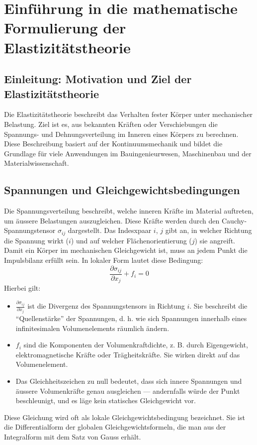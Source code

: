 %
%
%
%
\section{Einführung in die mathematische Formulierung der Elastizitätstheorie
\label{elastomechanik:section:math}}

\subsection{Einleitung: Motivation und Ziel der Elastizitätstheorie}
Die Elastizitätstheorie beschreibt das Verhalten fester Körper unter
mechanischer Belastung.
Ziel ist es, aus bekannten Kräften oder Verschiebungen die Spannungs-
und Dehnungsverteilung im Inneren eines Körpers zu berechnen.
Diese Beschreibung basiert auf der Kontinuumsmechanik und bildet
%
die Grundlage für viele Anwendungen im Bauingenieurwesen, Maschinenbau
und der Materialwissenschaft.

\subsection{Spannungen und Gleichgewichtsbedingungen
\label{elastomechanik:math:subsection:gleichgewicht}}
Die Spannungsverteilung beschreibt, welche inneren Kräfte im Material
auftreten, um äussere Belastungen auszugleichen.
Diese Kräfte werden durch den Cauchy-Spannungstensor $\sigma_{ij}$
dargestellt.
%
Das Indesxpaar $i$, $j$ gibt an, in welcher Richtung die Spannung
wirkt ($i$) und auf welcher Flächenorientierung ($j$) sie angreift.
Damit ein Körper im mechanischen Gleichgewicht ist, muss an jedem
Punkt die Impulsbilanz erfüllt sein. In lokaler Form lautet diese
Bedingung:
\begin{equation}
	\frac{\partial \sigma_{ij}}{\partial x_j} + f_i = 
	0
\label{elastomechanik:math:eqn:gleichgewicht}
\end{equation}
Hierbei gilt:
\begin{itemize}
\item $\frac{\partial \sigma_{ij}}{\partial x_j}$ ist die
Divergenz des Spannungstensors in Richtung $i$.  Sie beschreibt die
``Quellenstärke'' der Spannungen, d. h.  wie sich Spannungen innerhalb
eines infinitesimalen Volumenelements räumlich ändern.
\item $f_i$ sind die Komponenten der Volumenkraftdichte, z. B. durch
Eigengewicht, elektromagnetische Kräfte oder Trägheitskräfte. Sie
wirken direkt auf das Volumenelement.
\item Das Gleichheitszeichen zu null bedeutet, dass sich innere
Spannungen und äussere Volumenkräfte genau ausgleichen --- andernfalls
würde der Punkt beschleunigt, und es läge kein statisches Gleichgewicht
vor.
\end{itemize}
Diese Gleichung wird oft als lokale Gleichgewichtsbedingung bezeichnet. 
Sie ist die Differentialform der globalen Gleichgewichtsformeln,
die man aus der Integralform mit dem Satz von Gauss erhält.

